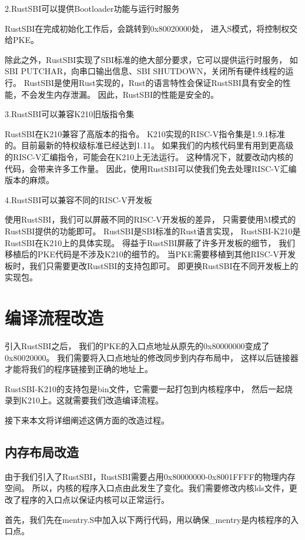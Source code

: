2.RustSBI可以提供Bootloader功能与运行时服务
    
RustSBI在完成初始化工作后，会跳转到0x80020000处，
进入S模式，将控制权交给PKE。

除此之外，RustSBI实现了SBI标准的绝大部分要求，它可以提供运行时服务，
如SBI PUTCHAR，向串口输出信息、SBI SHUTDOWN，关闭所有硬件线程的运行。
RustSBI是使用Rust实现的，Rust的语言特性会保证RustSBI具有安全的性能，不会发生内存泄漏。
因此，RustSBI的性能是安全的\cite{FSK2014The}。

3.RustSBI可以兼容K210旧版指令集

RustSBI在K210兼容了高版本的指令。
K210实现的RISC-V指令集是1.9.1标准的。目前最新的特权级标准已经达到1.11。
如果我们的内核代码里有用到更高级的RISC-V汇编指令，可能会在K210上无法运行。
这种情况下，就要改动内核的代码，会带来许多工作量。
因此，使用RustSBI可以使我们免去处理RISC-V汇编版本的麻烦。

4.RustSBI可以兼容不同的RISC-V开发板
    
使用RustSBI，我们可以屏蔽不同的RISC-V开发板的差异，
只需要使用M模式的RustSBI提供的功能即可。
RustSBI是SBI标准的Rust语言实现，
RustSBI-K210是RustSBI在K210上的具体实现。
得益于RustSBI屏蔽了许多开发板的细节，
我们移植后的PKE代码是不涉及K210的细节的。
当PKE需要移植到其他RISC-V开发板时，我们只需要更改RustSBI的支持包即可。
即更换RustSBI在不同开发板上的实现包。

\section{编译流程改造}

引入RustSBI之后，
我们的PKE的入口点地址从原先的0x80000000变成了0x80020000。
我们需要将入口点地址的修改同步到内存布局中，
这样以后链接器才能将我们的程序链接到正确的地址上。

RustSBI-K210的支持包是bin文件，它需要一起打包到内核程序中，
然后一起烧录到K210上。这就需要我们改造编译流程。

接下来本文将详细阐述这俩方面的改造过程。

\subsection{内存布局改造}
由于我们引入了RustSBI，RustSBI需要占用0x80000000-0x8001FFFF的物理内存空间。
所以，内核的程序入口点由此发生了变化。我们需要修改内核lds文件，更改了程序的入口点以保证内核可以正常运行。

首先，我们先在mentry.S中加入以下两行代码，用以确保\_mentry是内核程序的入口点。

